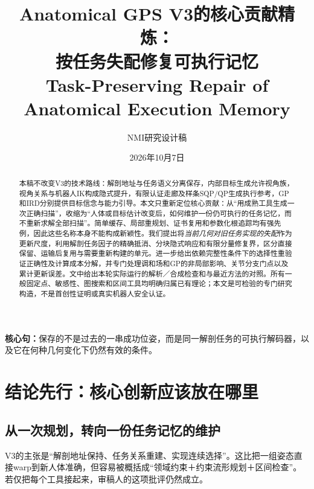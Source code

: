 \documentclass[UTF8,11pt,a4paper,fontset=fandol]{ctexart}
\numberwithin{equation}{section}
\theoremstyle{definition}
\begin{document}
\title{Anatomical GPS V3的核心贡献精炼：\\按任务失配修复可执行记忆\\[2mm]\large Task-Preserving Repair of Anatomical Execution Memory}
\author{NMI研究设计稿}
\date{2026年10月7日}
\maketitle
\begin{abstract}
本稿不改变V3的技术路线：解剖地址与任务语义分离保存，内部目标生成允许视角族，视角关系与机器人IK构成隐式提升，有限认证走廊及样条SQP/QP生成执行参考，GP和IRD分别提供目标信念与能力引导。本文只重新定位核心贡献：从“用成熟工具生成一次正确扫描”，收缩为“人体或目标估计改变后，如何维护一份仍可执行的任务记忆，而不重新求解全部扫描”。简单缓存、局部重规划、证书复用和参数化根追踪均有强先例，因此这些名称本身不能构成新颖性。我们提出将\emph{当前几何对旧任务实现的失配}作为更新尺度，利用解剖任务因子的精确抵消、分块隐式响应和有限分量修复界，区分直接保留、运输后复用与需要重新构建的单元。进一步给出依赖完整性条件下的选择性重验证正确性及计算成本分解，并专门处理调和场和GP的非局部影响、关节分支门点以及累计更新误差。文中给出本轮实际运行的解析／合成检查和与最近方法的对照。所有一般固定点、敏感性、图搜索和区间工具均明确归属已有理论；本文是可检验的专门研究构造，不是首创性证明或真实机器人安全认证。
\end{abstract}
\noindent\textbf{核心句：}保存的不是过去的一串成功位姿，而是同一解剖任务的可执行解码器，以及它在何种几何变化下仍然有效的条件。

\begin{center}\end{center}
\clearpage
\setcounter{tocdepth}{1}\tableofcontents
\clearpage

\section{结论先行：核心创新应该放在哪里}
\subsection{从一次规划，转向一份任务记忆的维护}
V3的主张是“解剖地址保持、任务关系重建、实现连续选择”\cite{v3}。这比把一组姿态直接warp到新人体准确，但容易被概括成“领域约束＋约束流形规划＋区间检查”。若仅把每个工具接起来，审稿人的这项批评仍然成立。
\end{document}
